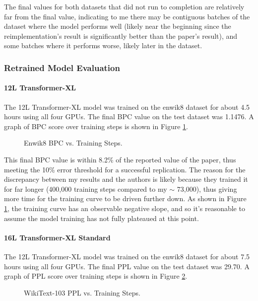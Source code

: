 \documentclass[11pt]{article}
\begin{document}
The final values for both datasets that did not run to completion are relatively far from the final value, indicating to me there may be contiguous batches of the dataset where the model performs well (likely near the beginning since the reimplementation's result is significantly better than the paper's result), and some batches where it performs worse, likely later in the dataset.

\subsubsection{Retrained Model Evaluation}

\paragraph{12L Transformer-XL}

The 12L Transformer-XL model was trained on the enwik8 dataset for about 4.5 hours using all four GPUs. The final BPC value on the test dataset was 1.1476. A graph of BPC score over training steps is shown in Figure \ref{fig:enwik8_train}.

\begin{figure}[!htbp]
\centering

\caption{Enwik8 BPC vs. Training Steps.}
\label{fig:enwik8_train}
\end{figure}

This final BPC value is within 8.2\% of the reported value of the paper, thus meeting the 10\% error threshold for a successful replication. The reason for the discrepancy between my results and the authors is likely because they trained it for far longer (400,000 training steps compared to my $\sim$ 73,000), thus giving more time for the training curve to be driven further down. As shown in Figure \ref{fig:enwik8_train}, the training curve has an observable negative slope, and so it's reasonable to assume the model training has not fully plateaued at this point.

\paragraph{16L Transformer-XL Standard}

The 12L Transformer-XL model was trained on the enwik8 dataset for about 7.5 hours using all four GPUs. The final PPL value on the test dataset was 29.70. A graph of PPL score over training steps is shown in Figure \ref{fig:wt103_train}.

\begin{figure}[!htbp]
\centering

\caption{WikiText-103 PPL vs. Training Steps.}
\label{fig:wt103_train}
\end{figure}
\end{document}

